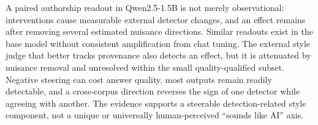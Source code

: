 A paired authorship readout in Qwen2.5-1.5B is not merely observational: interventions cause measurable external detector changes, and an effect remains after removing several estimated nuisance directions. Similar readouts exist in the base model without consistent amplification from chat tuning. The external style judge that better tracks provenance also detects an effect, but it is attenuated by nuisance removal and unresolved within the small quality-qualified subset. Negative steering can cost answer quality, most outputs remain readily detectable, and a cross-corpus direction reverses the sign of one detector while agreeing with another. The evidence supports a steerable detection-related style component, not a unique or universally human-perceived ``sounds like AI'' axis.
